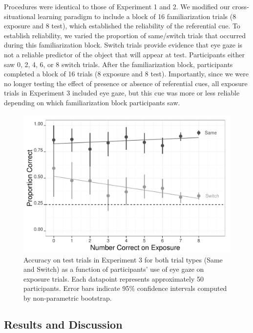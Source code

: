 \documentclass[10pt,letterpaper]{article}
\begin{document}
Procedures were identical to those of Experiment 1 and 2. We modified our cross-situational learning paradigm to include a block of 16 familiarization trials (8 exposure and 8 test), which established the reliability of the referential cue. To establish reliability, we varied the proportion of same/switch trials that occurred during this familiarization block. Switch trials provide evidence that eye gaze is not a reliable predictor of the object that will appear at test. Participants either saw 0, 2, 4, 6, or 8 switch trials. After the familiarization block, participants completed a block of 16 trials (8 exposure and 8 test). Importantly, since we were no longer testing the effect of presence or absence of referential cues, all exposure trials in Experiment 3 included eye gaze, but this cue was more or less reliable depending on which familiarization block participants saw.

\begin{figure}[t!]
\begin{center}
\includegraphics[scale=0.45]{plots_figs/acc-test-expt3}
\end{center}
\caption{Accuracy on test trials in Experiment 3 for both trial types (Same and Switch) as a function of participants' use of eye gaze on exposure trials. Each datapoint represents approximately 50 participants. Error bars indicate 95\% confidence intervals computed by non-parametric bootstrap.}
\end{figure}

\subsection{Results and Discussion}
\end{document}
